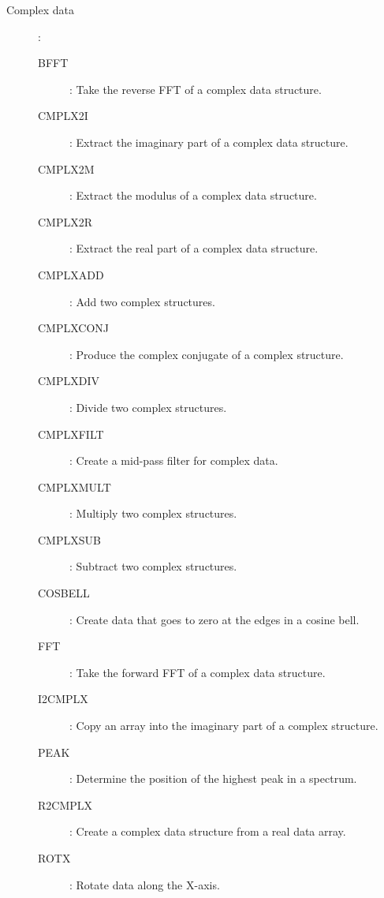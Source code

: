 \begin {description}
\begin{description}
\item [Complex data]\hspace{-1.5mm}:
\begin{description}
\item [BFFT]: Take the reverse FFT of a complex data structure.
\item [CMPLX2I]: Extract the imaginary part of a complex data structure.
\item [CMPLX2M]: Extract the modulus of a complex data structure.
\item [CMPLX2R]:  Extract the real part of a complex data structure.
\item [CMPLXADD]: Add two complex structures.
\item [CMPLXCONJ]: Produce the complex conjugate of a complex structure.
\item [CMPLXDIV]: Divide two complex structures.
\item [CMPLXFILT]: Create a mid-pass filter for complex data.
\item [CMPLXMULT]: Multiply two complex structures.
\item [CMPLXSUB]: Subtract two complex structures.
\item [COSBELL]: Create data that goes to zero at the edges in a cosine bell.
\item [FFT]: Take the forward FFT of a complex data structure.
\item [I2CMPLX]: Copy an array into the imaginary part of a complex structure.
\item [PEAK]: Determine the position of the highest peak in a spectrum.
\item [R2CMPLX]: Create a complex data structure from a real data array.
\item [ROTX]: Rotate data along the X-axis.
\end{description}


\end{description}
\end{description}
